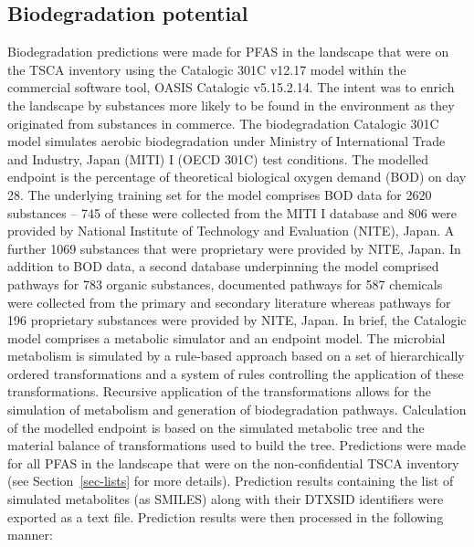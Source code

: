\documentclass[
  super,
  preprint,
  3p]{elsarticle}
\begin{document}
\hypertarget{biodegradation-potential}{%
\subsection{Biodegradation potential}\label{biodegradation-potential}}

Biodegradation predictions were made for PFAS in the landscape that were
on the TSCA inventory using the Catalogic 301C v12.17 model within the
commercial software tool, OASIS Catalogic v5.15.2.14. The intent was to
enrich the landscape by substances more likely to be found in the
environment as they originated from substances in commerce. The
biodegradation Catalogic 301C model simulates aerobic biodegradation
under Ministry of International Trade and Industry, Japan (MITI) I (OECD
301C) test conditions. The modelled endpoint is the percentage of
theoretical biological oxygen demand (BOD) on day 28. The underlying
training set for the model comprises BOD data for 2620 substances -- 745
of these were collected from the MITI I database and 806 were provided
by National Institute of Technology and Evaluation (NITE), Japan. A
further 1069 substances that were proprietary were provided by NITE,
Japan. In addition to BOD data, a second database underpinning the model
comprised pathways for 783 organic substances, documented pathways for
587 chemicals were collected from the primary and secondary literature
whereas pathways for 196 proprietary substances were provided by NITE,
Japan. In brief, the Catalogic model comprises a metabolic simulator and
an endpoint model. The microbial metabolism is simulated by a rule-based
approach based on a set of hierarchically ordered transformations and a
system of rules controlling the application of these transformations.
Recursive application of the transformations allows for the simulation
of metabolism and generation of biodegradation pathways. Calculation of
the modelled endpoint is based on the simulated metabolic tree and the
material balance of transformations used to build the tree. Predictions
were made for all PFAS in the landscape that were on the
non-confidential TSCA inventory (see Section~\ref{sec-lists} for more
details). Prediction results containing the list of simulated
metabolites (as SMILES) along with their DTXSID identifiers were
exported as a text file. Prediction results were then processed in the
following manner:
\end{document}
